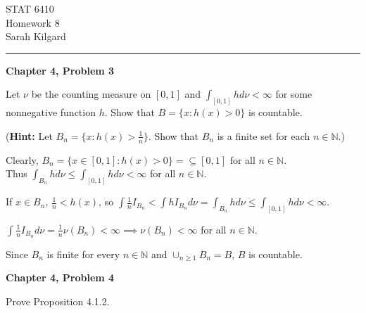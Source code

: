 \documentclass[12pt,letterpaper, onecolumn]{exam}
\newcommand{\nat}{\mathbb{N}}
\begin{document}
\begingroup  
    \centering
    \LARGE STAT 6410\\
    \LARGE Homework 8\\[0.5em]
    \large Sarah Kilgard\par
\endgroup
\rule{\textwidth}{0.4pt}
\pointsdroppedatright   %
\printanswers
\renewcommand{\solutiontitle}{\noindent\textbf{Ans:}\enspace}   %

\begin{questions}
    \question \textbf{Chapter 4, Problem 3}

    Let $\nu$ be the counting measure on $[0,1]$ and $\int_{[0,1]} h d\nu < \infty$ for some nonnegative function $h$. Show that $B = \{x : h(x) > 0\}$ is countable. 

    (\textbf{Hint:} Let $B_n = \{x : h(x) > \frac{1}{n}\}$. Show that $B_n$ is a finite set for each $n \in \nat$.)
    \begin{solution}
    Clearly, $B_n = \{x \in [0, 1]: h(x) > 0\} = \subseteq [0, 1]$ for all $n \in \nat$. \\ Thus $\int_{B_n} h d\nu \leq \int_{[0,1]} h d\nu < \infty$ for all $n \in \nat$. 

    If $x \in B_n$, $\frac{1}{n} < h(x)$, so $\int \frac{1}{n} I_{B_n} < \int h I_{B_n} d\nu = \int_{B_n} h d \nu \leq \int_{[0,1]} h d\nu < \infty$.

    $\int \frac{1}{n} I_{B_n} d\nu = \frac{1}{n} \nu(B_n) < \infty \implies \nu(B_n) < \infty$  for all $n \in \nat$.

    Since $B_n$ is finite for every $n \in \nat$ and $\cup_{n\geq 1} B_n = B$, $B$ is countable. 
    \end{solution}

    \question \textbf{Chapter 4, Problem 4}

    Prove Proposition 4.1.2.


\end{questions}
\end{document}
